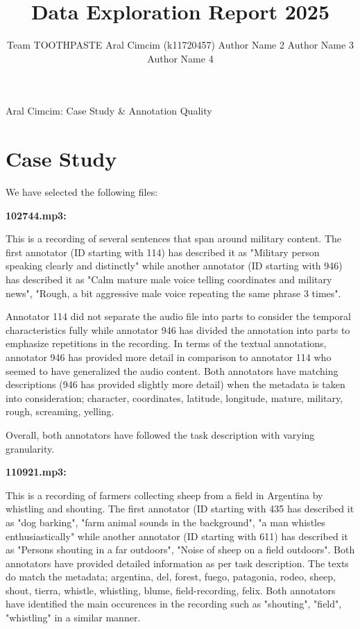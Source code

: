 \documentclass{article}
\title{Data Exploration Report 2025}
\author{%
  Team TOOTHPASTE \AND
  Aral Cimcim (k11720457)
  \And
  Author Name 2 
  \And 
  Author Name 3 
  \And 
  Author Name 4
}
\begin{document}
\maketitle


\begin{contributions}
  Aral Cimcim: Case Study \& Annotation Quality\\ 
  
\end{contributions}


\section{Case Study}

We have selected the following files:

\textbf{102744.mp3:}

This is a recording of several sentences that span around military content. The first annotator (ID starting with 114) has described it as "Military person speaking clearly and distinctly" while another annotator (ID starting with 946) has described it as "Calm mature male voice telling coordinates and military news", "Rough, a bit aggressive male voice repeating the same phrase 3 times". 

Annotator 114 did not separate the audio file into parts to consider the temporal characteristics fully while annotator 946 has divided the annotation into parts to emphasize repetitions in the recording. In terms of the textual annotations, annotator 946 has provided more detail in comparison to annotator 114 who seemed to have generalized the audio content. Both annotators have matching descriptions (946 has provided slightly more detail) when the metadata is taken into consideration; character, coordinates, latitude, longitude, mature, military, rough, screaming, yelling.

Overall, both annotators have followed the task description with varying granularity.

\vspace{3mm}

\textbf{110921.mp3:}

This is a recording of farmers collecting sheep from a field in Argentina by whistling and shouting. The first annotator (ID starting with 435 has described it as "dog barking", "farm animal sounds in the background", "a man whistles enthusiastically" while another annotator (ID starting with 611) has described it as "Persons shouting in a far outdoors", "Noise of sheep on a field outdoors". Both annotators have provided detailed information as per task description. The texts do match the metadata; argentina, del, forest, fuego, patagonia, rodeo, sheep, shout, tierra, whistle, whistling, blume, field-recording, felix. Both annotators have identified the main occurences in the recording such as "shouting", "field", "whistling" in a similar manner. 
\end{document}
